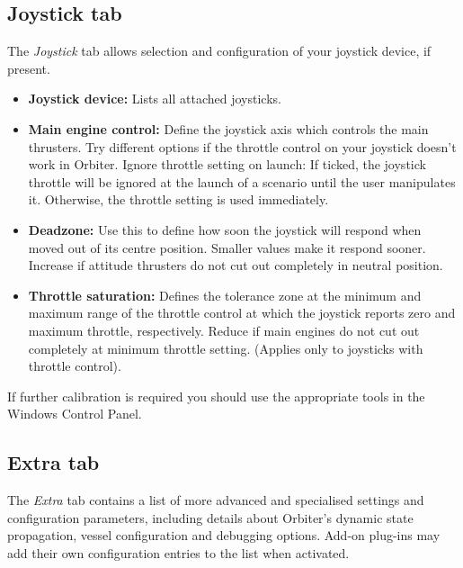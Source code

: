 \documentclass[Orbiter User Manual.tex]{subfiles}
\begin{document}
\subsection{Joystick tab}
The \textit{Joystick} tab allows selection and configuration of your joystick device, if present.

\begin{figure}[H]
	\centering
\end{figure}

\noindent

\begin{itemize}
\item \textbf{Joystick device:} Lists all attached joysticks.
\item \textbf{Main engine control:} Define the joystick axis which controls the main thrusters. Try different options if the throttle control on your joystick doesn’t work in Orbiter.\newline
Ignore throttle setting on launch: If ticked, the joystick throttle will be ignored at the launch of a scenario until the user manipulates it. Otherwise, the throttle setting is used immediately.
\item \textbf{Deadzone:} Use this to define how soon the joystick will respond when moved out of its centre position. Smaller values make it respond sooner. Increase if attitude thrusters do not cut out completely in neutral position.
\item \textbf{Throttle saturation:} Defines the tolerance zone at the minimum and maximum range of the throttle control at which the joystick reports zero and maximum throttle, respectively. Reduce if main engines do not cut out completely at minimum throttle setting. (Applies only to joysticks with throttle control).
\end{itemize}

\noindent
If further calibration is required you should use the appropriate tools in the Windows Control Panel.


\subsection{Extra tab}
The \textit{Extra} tab contains a list of more advanced and specialised settings and configuration parameters, including details about Orbiter’s dynamic state propagation, vessel configuration and debugging options. Add-on plug-ins may add their own configuration entries to the list when activated.
\end{document}
